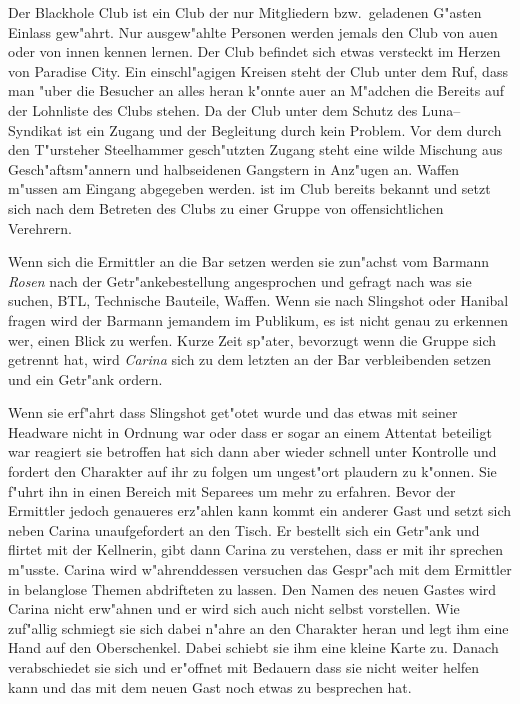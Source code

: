
Der Blackhole Club ist ein Club der nur Mitgliedern bzw.~geladenen G"asten Einlass gew"ahrt. Nur ausgew"ahlte Personen werden jemals den Club von au\3en oder von innen kennen lernen. Der Club befindet sich etwas versteckt im Herzen von Paradise City. Ein einschl"agigen Kreisen steht der Club unter dem Ruf, dass man "uber die Besucher an alles heran k"onnte au\3er an M"adchen die Bereits auf der Lohnliste des Clubs stehen. Da der Club unter dem Schutz des Luna--Syndikat ist ein Zugang und der Begleitung durch \xl{} kein Problem. Vor dem durch den T"ursteher Steelhammer gesch"utzten Zugang steht eine wilde Mischung aus Gesch"aftsm"annern und halbseidenen Gangstern in Anz"ugen an. Waffen m"ussen am Eingang abgegeben werden. \xl{} ist im Club bereits bekannt und setzt sich nach dem Betreten des Clubs zu einer Gruppe von offensichtlichen Verehrern.

Wenn sich die Ermittler an die Bar setzen werden sie zun"achst vom Barmann \emph{Rosen} nach der Getr"ankebestellung angesprochen und gefragt nach was sie suchen, BTL, Technische Bauteile, Waffen. Wenn sie nach Slingshot oder Hanibal fragen wird der Barmann jemandem im Publikum, es ist nicht genau zu erkennen wer, einen Blick zu werfen. Kurze Zeit sp"ater, bevorzugt wenn die Gruppe sich getrennt hat, wird \emph{Carina} sich zu dem letzten an der Bar verbleibenden setzen und ein Getr"ank ordern.


Wenn sie erf"ahrt dass Slingshot get"otet wurde und das etwas mit seiner Headware nicht in Ordnung war oder dass er sogar an einem Attentat beteiligt war reagiert sie betroffen hat sich dann aber wieder schnell unter Kontrolle und fordert den Charakter auf ihr zu folgen um ungest"ort plaudern zu k"onnen. Sie f"uhrt ihn in einen Bereich mit Separees um mehr zu erfahren. Bevor der Ermittler jedoch genaueres erz"ahlen kann kommt ein anderer Gast und setzt sich neben Carina unaufgefordert an den Tisch. Er bestellt sich ein Getr"ank und flirtet mit der Kellnerin, gibt dann Carina zu verstehen, dass er mit ihr sprechen m"usste. Carina wird w"ahrenddessen versuchen das Gespr"ach mit dem Ermittler in belanglose Themen abdrifteten zu lassen. Den Namen des neuen Gastes wird Carina nicht erw"ahnen und er wird sich auch nicht selbst vorstellen. Wie zuf"allig schmiegt sie sich dabei n"ahre an den Charakter heran und legt ihm eine Hand auf den Oberschenkel. Dabei schiebt sie ihm eine kleine Karte zu. Danach verabschiedet sie sich und er"offnet mit Bedauern dass sie nicht weiter helfen kann und das mit dem neuen Gast noch etwas zu besprechen hat.

